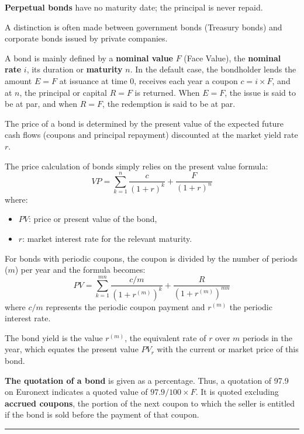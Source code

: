 \begin{f}
\textbf{Perpetual bonds} have no maturity date; the principal is never repaid.
 
A distinction is often made between government bonds (Treasury bonds) and
 corporate bonds issued by private companies.



A bond is mainly defined by a \textbf{nominal value} \(F\) (Face Value), the \textbf{nominal rate} \(i\), its duration or \textbf{maturity} \(n\).
In the default case, the bondholder lends the amount \(E=F\) at issuance at time 0, receives each year a coupon \(c = i \times F\), and at \(n\), the principal or capital \(R=F\) is returned.
When \(E=F\), the issue is said to be at par, and when \(R=F\), the redemption is said to be at par.


The price of a bond is determined by the present value of the expected future cash flows (coupons and principal repayment) discounted at the market yield rate \(r\).
 
The price calculation of bonds simply relies on the present value formula:
\[
VP = \sum_{k=1}^{n} \frac{c}{(1 + r)^k} + \frac{F}{(1 + r)^n}
 \]
where:
\begin{itemize}
	\item \(PV\): price or present value of the bond,
	\item \(r\): market interest rate for the relevant maturity.
\end{itemize}


For bonds with periodic coupons, the coupon is divided by the number of periods (\(m\)) per year and the formula becomes:
\[ 
PV = \sum_{k=1}^{mn} \frac{c/m}{(1 + r^{(m)})^k} + \frac{R}{(1 + r^{(m)})^{mn}}
 \]
where \(c/m\) represents the periodic coupon payment and \(r^{(m)}\) the periodic interest rate.

The bond yield is the value \(r^{(m)}\), the equivalent rate of \(r\) over \(m\) periods in the year, which equates the present value \(PV_r\) with the current or market price of this bond.

\textbf{The quotation of a bond} is given as a percentage. Thus, a quotation of 97.9 on Euronext indicates a quoted value of \(97.9 / 100 \times F\). 
It is quoted excluding \textbf{accrued coupons}, the portion of the next coupon to which the seller is entitled if the bond is sold before the payment of that coupon.
\end{f}
\hrule

